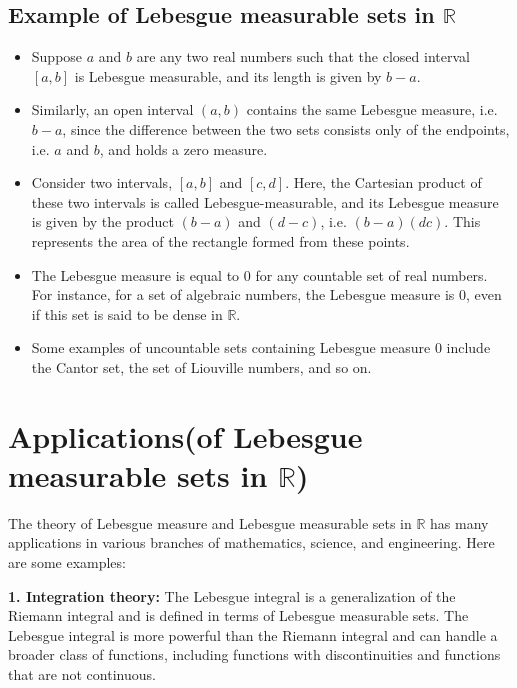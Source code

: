 \documentclass[12pt, a4paper]{article} %
\begin{document}
        \subsection{Example of Lebesgue measurable sets in $\mathbb{R}$}

        \begin{itemize}
            \item Suppose $a$ and $b$ are any two real numbers such that the closed interval $[a, b]$ is Lebesgue measurable, and its length is given by $b-a$.


            \item Similarly, an open interval $(a, b)$ contains the same Lebesgue measure, i.e. $b-a$, since the difference between the two sets consists only of the endpoints, i.e. $a$ and $b$, and holds a zero measure.
    
    
            \item Consider two intervals, $[a, b]$ and $[c, d]$. Here, the Cartesian product of these two intervals is called Lebesgue-measurable, and its Lebesgue measure is given by the product $(b - a)$ and $(d - c)$, i.e. $(b - a)(d  c)$. This represents the area of the rectangle formed from these points.
    
    
            \item The Lebesgue measure is equal to $0$ for any countable set of real numbers. For instance, for a set of algebraic numbers, the Lebesgue measure is $0$, even if this set is said to be dense in $\mathbb{R}$.
    
    
            \item Some examples of uncountable sets containing Lebesgue measure $0$ include the Cantor set, the set of Liouville numbers, and so on.
        \end{itemize}

        \section{Applications(of Lebesgue measurable sets in $\mathbb{R}$)}

           The theory of Lebesgue measure and Lebesgue measurable sets in $\mathbb{R}$ has many applications in various branches of mathematics, science, and engineering. Here are some examples:



           {\bf 1. Integration theory:} The Lebesgue integral is a generalization of the Riemann integral and is defined in terms of Lebesgue measurable sets. The Lebesgue integral is more powerful than the Riemann integral and can handle a broader class of functions, including functions with discontinuities and functions that are not continuous.
\end{document}
